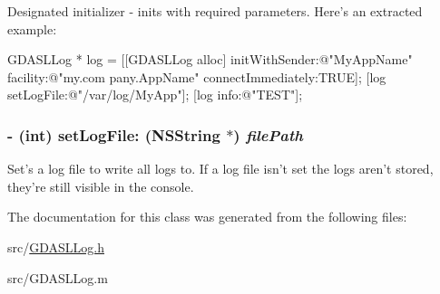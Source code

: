 Designated initializer -\/ inits with required parameters. Here's an extracted example: 
\begin{DoxyCode}
 GDASLLog * log = [[GDASLLog alloc] initWithSender:@"MyAppName" facility:@"my.com
      pany.AppName" connectImmediately:TRUE];
 [log setLogFile:@"/var/log/MyApp"];
 [log info:@"TEST"];
\end{DoxyCode}
 \hypertarget{interface_g_d_a_s_l_log_a60c2903d8fb00b34fafe5c2c1965f811}{
\subsubsection[{setLogFile:}]{\setlength{\rightskip}{0pt plus 5cm}-\/ (int) setLogFile: (NSString $\ast$) {\em filePath}}}
\label{interface_g_d_a_s_l_log_a60c2903d8fb00b34fafe5c2c1965f811}


Set's a log file to write all logs to. If a log file isn't set the logs aren't stored, they're still visible in the console. 

The documentation for this class was generated from the following files:\begin{DoxyCompactItemize}
\item 
src/\hyperlink{_g_d_a_s_l_log_8h}{GDASLLog.h}\item 
src/GDASLLog.m\end{DoxyCompactItemize}
